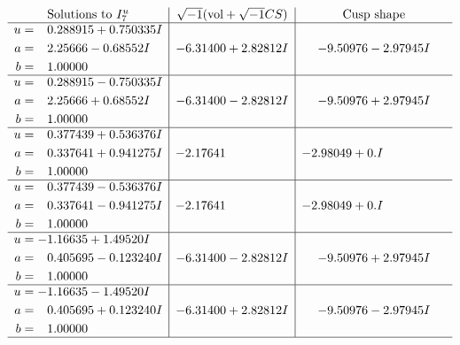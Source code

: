 \documentclass[1p]{elsarticle_modified}
\theoremstyle{definition}
\newcommand{\I}{\sqrt{-1}}
\begin{document}
$$\begin{array}{c|c|c}  
\text{Solutions to }I^u_{7}& \I (\text{vol} + \sqrt{-1}CS) & \text{Cusp shape}\\
 \hline 
\begin{aligned}
u &= \phantom{-}0.288915 + 0.750335 I \\
a &= \phantom{-}2.25666 - 0.68552 I \\
b &= \phantom{-}1.00000\phantom{ +0.000000I}\end{aligned}
 & -6.31400 + 2.82812 I & -9.50976 - 2.97945 I \\ \hline\begin{aligned}
u &= \phantom{-}0.288915 - 0.750335 I \\
a &= \phantom{-}2.25666 + 0.68552 I \\
b &= \phantom{-}1.00000\phantom{ +0.000000I}\end{aligned}
 & -6.31400 - 2.82812 I & -9.50976 + 2.97945 I \\ \hline\begin{aligned}
u &= \phantom{-}0.377439 + 0.536376 I \\
a &= \phantom{-}0.337641 + 0.941275 I \\
b &= \phantom{-}1.00000\phantom{ +0.000000I}\end{aligned}
 & -2.17641\phantom{ +0.000000I} & -2.98049 + 0. I\phantom{ +0.000000I} \\ \hline\begin{aligned}
u &= \phantom{-}0.377439 - 0.536376 I \\
a &= \phantom{-}0.337641 - 0.941275 I \\
b &= \phantom{-}1.00000\phantom{ +0.000000I}\end{aligned}
 & -2.17641\phantom{ +0.000000I} & -2.98049 + 0. I\phantom{ +0.000000I} \\ \hline\begin{aligned}
u &= -1.16635 + 1.49520 I \\
a &= \phantom{-}0.405695 - 0.123240 I \\
b &= \phantom{-}1.00000\phantom{ +0.000000I}\end{aligned}
 & -6.31400 - 2.82812 I & -9.50976 + 2.97945 I \\ \hline\begin{aligned}
u &= -1.16635 - 1.49520 I \\
a &= \phantom{-}0.405695 + 0.123240 I \\
b &= \phantom{-}1.00000\phantom{ +0.000000I}\end{aligned}
 & -6.31400 + 2.82812 I & -9.50976 - 2.97945 I\\
 \hline 
 \end{array}$$\newpage\newpage\renewcommand{\arraystretch}{1}
\end{document}
